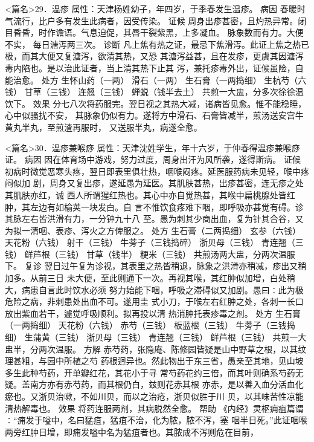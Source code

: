 \documentclass[a4paper,12pt,UTF8,twoside]{ctexbook}
\begin{document}
<篇名>29．温疹
属性：天津杨姓幼子，年四岁，于季春发生温疹。 
病因 春暖时气流行，比户多有发生此病者，因受传染。 
证候 周身出疹甚密，且灼热异常。闭目昏昏，时作谵语。气息迫促，其唇干裂紫黑，上多凝血。 
脉象数而有力。大便不实， 
每日溏泻两三次。 
诊断 凡上焦有热之证，最忌下焦滑泻。此证上焦之热已极，而其大便又复溏泻，欲清其热，又恐 
其溏泻益甚，且在发疹，更虞其因溏泻毒内陷也。是以治此证者，当上清其热下止其 
泻，兼托疹毒外出，证候虽险，自能治愈。 
处方 生怀山药（一两） 滑石（一两） 生石膏（一两捣细） 生杭芍（六钱） 
甘草（三钱） 连翘（三钱） 蝉蜕（钱半去土） 
共煎一大盅，分多次徐徐温饮下。 
效果 分七八次将药服完。翌日视之其热大减，诸病皆见愈。惟不能稳睡，心中似骚扰不安， 
其脉象仍似有力。遂将方中滑石、石膏皆减半，煎汤送安宫牛黄丸半丸，至煎渣再服时， 
又送服半丸，病遂全愈。 


<篇名>30．温疹兼喉痧
属性：天津沈姓学生，年十六岁，于仲春得温疹兼喉痧证。 
病因 因在体育场中游戏，努力过度，周身出汗为风所袭，遂得斯病。 
证候 初病时微觉恶寒头疼，翌日即表里俱壮热，咽喉闷疼。延医服药病未见轻，喉中疼闷似加 
剧，周身又复出疹，遂延愚为延医。其肌肤甚热，出疹甚密，连无疹之处其肌肤亦红，诚 
西人所谓猩红热也。其心中亦自觉热甚，其喉中扁桃腺处皆红肿，其左边有如榆荚一块发白。自 
言不惟饮食疼难下咽，即呼吸亦甚觉有碍。诊其脉左右皆洪滑有力，一分钟九十八 
至。愚为刺其少商出血，复为针其合谷，又为拟一清咽、表疹、泻火之方俾服之。 
处方 生石膏（二两捣细） 玄参（六钱） 天花粉（六钱） 射干（三钱） 
牛蒡子（三钱捣碎） 浙贝母（三钱） 青连翘（三钱） 鲜芦根（三钱） 
甘草（钱半） 粳米（三钱） 
共煎汤两大盅，分两次温服下。 
复诊 翌日过午复为诊视，其表里之热皆稍退，脉象之洪滑亦稍减，疹出又稍加多。从前三日 
未大便，至此则通下一次。再视其喉，其红肿似加增，白处稍大，病患自言此时饮水必须 
努力始能下咽，呼吸之滞碍似又加剧。愚曰∶此为极危险之病，非刺患处出血不可。遂用圭 
式小刀，于喉左右红肿之处，各刺一长口放出紫血若干，遽觉呼吸顺利。拟再投以清 
热消肿托表疹毒之剂。 
处方 生石膏（一两捣细） 天花粉（六钱） 赤芍（三钱） 板蓝根（三钱） 
牛蒡子（三钱捣细） 生蒲黄（三钱） 浙贝母（三钱） 青连翘（三钱） 鲜芦根（三钱） 
共煎一大盅半，分两次温服。 
方解 赤芍药，张隐庵、陈修园皆疑是山中野草之根，以其纹理甚粗，与园中所植之芍 
药根迥异也。然此物出于东三省，愚亲至其地，见山坡多生此种芍药，开单瓣红花，其花小于寻 
常芍药花约三倍，而其叶则确系芍药无疑。盖南方亦有赤芍药，而其根仍白，兹则花赤其根 
亦赤，是以善入血分活血化瘀也。又浙贝治嗽，不如川贝，而以之治疮，浙贝似胜于川 
贝，以其味苦性凉能清热解毒也。 
效果 将药连服两剂，其病脱然全愈。 
帮助 《内经》灵枢痈疽篇谓∶“痈发于嗌中，名曰猛疽，猛疽不治，化为脓，脓不泻，塞 
咽半日死。”此证咽喉两旁红肿日增，即痈发嗌中名为猛疽者也。其脓成不泻则危在目前， 
\end{document}
